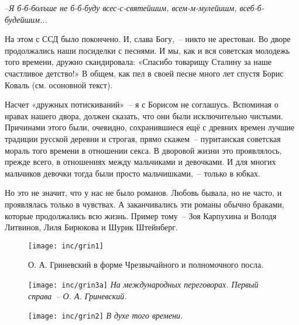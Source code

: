 --\textit{Я б-б-болъше не б-б-буду всес-с-святейшим, всем-м-мулейишм, всеб-б-будейшим...}

На этом с ССД было покончено. И, слава Богу,~-- никто не арестован. Во дворе продолжались наши посиделки с песнями. И мы, как и вся советская молодежь того времени, дружно скандировала: «Спасибо товарищу Сталину за наше счастливое детство!» В общем, как пел в своей песне много лет спустя Борис Коваль (см. осоновной текст).

Насчет «дружных потискиваний»~-- я с Борисом не соглашусь. Вспоминая о нравах нашего двора, должен сказать, что они были исключительно чистыми. Причинами этого были, очевидно, сохранившиеся ещё с древних времен лучшие традиции русской деревни и строгая, прямо скажем~-- пуританская советская мораль того времени в отношении секса. В дворовой жизни это проявлялось, прежде всего, в отношениях между мальчиками и девочками. И для многих мальчиков девочки тогда были просто мальчишками,~-- только в юбках.

Но это не значит, что у нас не было романов. Любовь бывала, но не часто, и проявлялась только в чувствах. А заканчивались эти романы обычно браками, которые продолжались всю жизнь. Пример тому~-- Зоя Карпухина и Володя Литвинов, Лиля Бирюкова и Шурик Штейнберг.

\vspace{5pt}


\begin{figure}
        \texttt{[image: inc/grin1]}
        \caption{О. А. Гриневский в форме Чрезвычайного и полномочного посла.}
\end{figure}

\begin{figure}[ht!]
    \begin{minipage}{100mm}
        \texttt{[image: inc/grin3a]}
        \footnotesize{\textit{На международных переговорах. Первый справа~-- О. А. Гриневский.}}
     \end{minipage}
\end{figure}

\vspace{10pt}

\begin{figure}[h!]
\begin{minipage}{100mm}
    \texttt{[image: inc/grin2]}
    \footnotesize{\textit{В духе того времени.}}
\end{minipage}
\end{figure}

